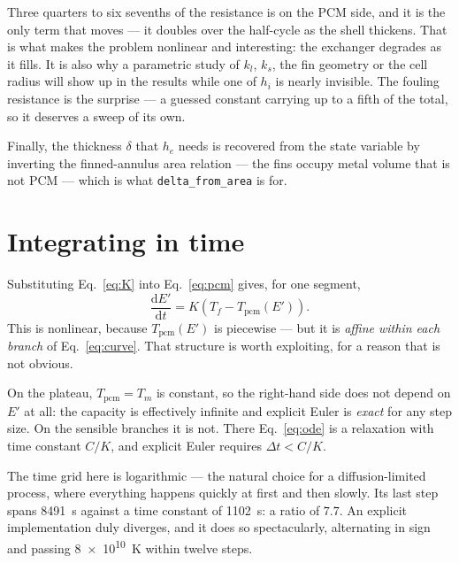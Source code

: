 \documentclass[11pt,a4paper]{article}
\newcommand{\Tm}{\ensuremath{T_{m}}}
\newcommand{\Tpcm}{\ensuremath{T_{\mathrm{pcm}}}}
\newcommand{\code}[1]{\texttt{\small #1}}
\begin{document}
\noindent
Three quarters to six sevenths of the resistance is on the PCM side, and it is
the only term that moves --- it doubles over the half-cycle as the shell
thickens. That is what makes the problem nonlinear and interesting: the
exchanger degrades as it fills. It is also why a parametric study of $k_l$,
$k_s$, the fin geometry or the cell radius will show up in the results while one
of $h_i$ is nearly invisible. The fouling resistance is the surprise --- a
guessed constant carrying up to a fifth of the total, so it deserves a sweep of
its own.

Finally, the thickness $\delta$ that $h_e$ needs is recovered from the state
variable by inverting the finned-annulus area relation --- the fins occupy metal
volume that is not PCM --- which is what \code{delta\_from\_area} is for.

\section{Integrating in time}
\label{sec:integration}

Substituting Eq.~\eqref{eq:K} into Eq.~\eqref{eq:pcm} gives, for one segment,
\begin{equation}
  \frac{\mathrm{d}E'}{\mathrm{d}t} = K\left(T_f - \Tpcm(E')\right).
  \label{eq:ode}
\end{equation}
This is nonlinear, because $\Tpcm(E')$ is piecewise --- but it is \emph{affine
within each branch} of Eq.~\eqref{eq:curve}. That structure is worth
exploiting, for a reason that is not obvious.

On the plateau, $\Tpcm=\Tm$ is constant, so the right-hand side does not depend
on $E'$ at all: the capacity is effectively infinite and explicit Euler is
\emph{exact} for any step size. On the sensible branches it is not. There
Eq.~\eqref{eq:ode} is a relaxation with time constant $C/K$, and explicit Euler
requires $\Delta t < C/K$.

The time grid here is logarithmic --- the natural choice for a diffusion-limited
process, where everything happens quickly at first and then slowly. Its last
step spans \SI{8491}{\second} against a time constant of
\SI{1102}{\second}: a ratio of $7.7$. An explicit implementation duly diverges,
and it does so spectacularly, alternating in sign and passing
\SI{8e10}{\kelvin} within twelve steps.
\end{document}
